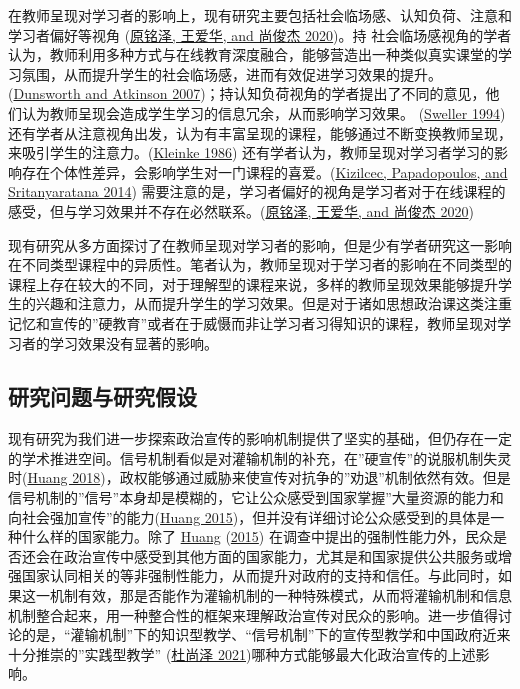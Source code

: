 \documentclass[
  12pt,
]{ctexart}
\begin{document}
在教师呈现对学习者的影响上，现有研究主要包括社会临场感、认知负荷、注意和学习者偏好等视角 (\protect\hyperlink{ref-YuanMingZeEtAl2020a}{原铭泽, 王爱华, and 尚俊杰 2020})。持 社会临场感视角的学者认为，教师利用多种方式与在线教育深度融合，能够营造出一种类似真实课堂的学习氛围，从而提升学生的社会临场感，进而有效促进学习效果的提升。(\protect\hyperlink{ref-DunsworthAtkinson2007}{Dunsworth and Atkinson 2007})；持认知负荷视角的学者提出了不同的意见，他们认为教师呈现会造成学生学习的信息冗余，从而影响学习效果。 (\protect\hyperlink{ref-Sweller1994}{Sweller 1994}) 还有学者从注意视角出发，认为有丰富呈现的课程，能够通过不断变换教师呈现，来吸引学生的注意力。(\protect\hyperlink{ref-Kleinke1986}{Kleinke 1986}) 还有学者认为，教师呈现对学习者学习的影响存在个体性差异，会影响学生对一门课程的喜爱。(\protect\hyperlink{ref-KizilcecEtAl2014}{Kizilcec, Papadopoulos, and Sritanyaratana 2014}) 需要注意的是，学习者偏好的视角是学习者对于在线课程的感受，但与学习效果并不存在必然联系。(\protect\hyperlink{ref-YuanMingZeEtAl2020a}{原铭泽, 王爱华, and 尚俊杰 2020})

现有研究从多方面探讨了在教师呈现对学习者的影响，但是少有学者研究这一影响在不同类型课程中的异质性。笔者认为，教师呈现对于学习者的影响在不同类型的课程上存在较大的不同，对于理解型的课程来说，多样的教师呈现效果能够提升学生的兴趣和注意力，从而提升学生的学习效果。但是对于诸如思想政治课这类注重记忆和宣传的''硬教育''或者在于威慑而非让学习者习得知识的课程，教师呈现对学习者的学习效果没有显著的影响。

\hypertarget{ux7814ux7a76ux95eeux9898ux4e0eux7814ux7a76ux5047ux8bbe}{%
\subsection{研究问题与研究假设}\label{ux7814ux7a76ux95eeux9898ux4e0eux7814ux7a76ux5047ux8bbe}}

现有研究为我们进一步探索政治宣传的影响机制提供了坚实的基础，但仍存在一定的学术推进空间。信号机制看似是对灌输机制的补充，在''硬宣传''的说服机制失灵时(\protect\hyperlink{ref-Huang2018}{Huang 2018})，政权能够通过威胁来使宣传对抗争的''劝退''机制依然有效。但是信号机制的''信号''本身却是模糊的，它让公众感受到国家掌握''大量资源的能力和向社会强加宣传''的能力(\protect\hyperlink{ref-Huang2015a}{Huang 2015})，但并没有详细讨论公众感受到的具体是一种什么样的国家能力。除了 \protect\hyperlink{ref-Huang2015a}{Huang} (\protect\hyperlink{ref-Huang2015a}{2015}) 在调查中提出的强制性能力外，民众是否还会在政治宣传中感受到其他方面的国家能力，尤其是和国家提供公共服务或增强国家认同相关的等非强制性能力，从而提升对政府的支持和信任。与此同时，如果这一机制有效，那是否能作为灌输机制的一种特殊模式，从而将灌输机制和信息机制整合起来，用一种整合性的框架来理解政治宣传对民众的影响。进一步值得讨论的是，``灌输机制''下的知识型教学、``信号机制''下的宣传型教学和中国政府近来十分推崇的''实践型教学'' (\protect\hyperlink{ref-DuShangZe2021}{杜尚泽 2021})哪种方式能够最大化政治宣传的上述影响。
\end{document}
